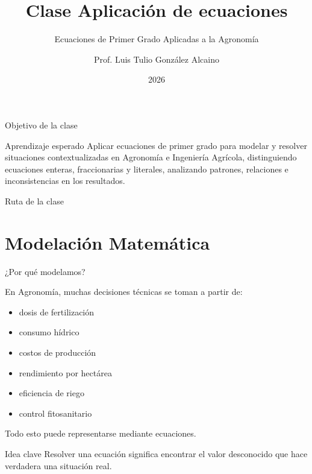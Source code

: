 \documentclass[handout,aspectratio=169]{beamer}
\title{Clase Aplicación de ecuaciones}
\subtitle{Ecuaciones de Primer Grado Aplicadas a la Agronomía}
\author{Prof. Luis Tulio González Alcaino}
\institute{Universidad Santo Tomás\\Departamento de Ciencias Básicas}
\date{2026}
\begin{document}
	
	\begin{frame}
		\titlepage
	\end{frame}
	
	\begin{frame}{Objetivo de la clase}
		\begin{block}{Aprendizaje esperado}
			Aplicar ecuaciones de primer grado para modelar y resolver
			situaciones contextualizadas en Agronomía e Ingeniería Agrícola,
			distinguiendo ecuaciones enteras, fraccionarias y literales,
			analizando patrones, relaciones e inconsistencias en los resultados.
		\end{block}
	\end{frame}
	
	\begin{frame}{Ruta de la clase}
		\tableofcontents
	\end{frame}
	
	\section{Modelación Matemática}
	
	\begin{frame}{¿Por qué modelamos?}
		
		En Agronomía, muchas decisiones técnicas se toman a partir de:
		
		\begin{itemize}
			\item dosis de fertilización
			\item consumo hídrico
			\item costos de producción
			\item rendimiento por hectárea
			\item eficiencia de riego
			\item control fitosanitario
		\end{itemize}
		
		Todo esto puede representarse mediante ecuaciones.
		
		\begin{block}{Idea clave}
			Resolver una ecuación significa encontrar el valor desconocido
			que hace verdadera una situación real.
		\end{block}
		
	\end{frame}
	
\end{document}
